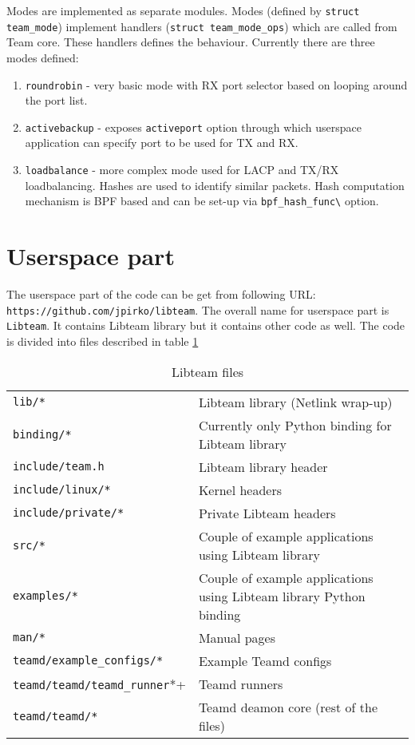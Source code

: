 \documentclass[11pt,a4paper]{article}
\begin{document}
Modes are implemented as separate modules. Modes (defined by \verb+struct team_mode+) implement handlers (\verb+struct team_mode_ops+) which are called from Team core. These handlers defines the behaviour. Currently there are three modes defined:

\begin{enumerate}
\item \verb+roundrobin+ - very basic mode with RX port selector based on looping around the port list.
\item \verb+activebackup+ - exposes \verb+activeport+ option through which userspace application can specify port to be used for TX and RX.
\item \verb+loadbalance+ - more complex mode used for LACP and TX/RX loadbalancing. Hashes are used to identify similar packets. Hash computation mechanism is BPF based and can be set-up via \verb+bpf_hash_func\+ option.
\end{enumerate}

\section{Userspace part}

The userspace part of the code can be get from following URL: \verb+https://github.com/jpirko/libteam+. The overall name for userspace part is \verb+Libteam+. It contains Libteam library but it contains other code as well. The code is divided into files described in table \ref{table2}

\begin{table}[ht]
  \begin{tabular}{ l l }
    \verb+lib/*+ & Libteam library (Netlink wrap-up)  \\
    \verb+binding/*+ & Currently only Python binding for Libteam library \\
    \verb+include/team.h+ & Libteam library header \\
    \verb+include/linux/*+ & Kernel headers \\
    \verb+include/private/*+ & Private Libteam headers \\
    \verb+src/*+ & Couple of example applications using Libteam library \\
    \verb+examples/*+ & Couple of example applications using Libteam library Python binding \\
    \verb+man/*+ & Manual pages \\
    \verb+teamd/example_configs/*+ & Example Teamd configs \\
    \verb+teamd/teamd/teamd_runner+*+ & Teamd runners \\
    \verb+teamd/teamd/*+ & Teamd deamon core (rest of the files) \\
  \end{tabular}
  \caption{Libteam files}
  \label{table2}
\end{table}
\end{document}
